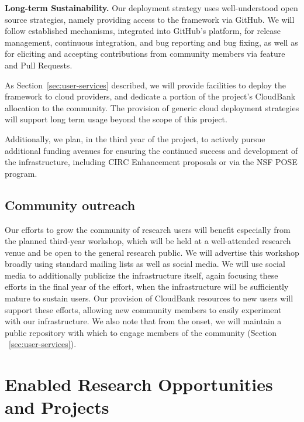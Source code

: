 \vspace{1ex}
\noindent\textbf{Long-term Sustainability.} Our deployment strategy uses
well-understood open source strategies, namely providing access to the framework
via GitHub.  We will follow established mechanisms, integrated into GitHub's
platform, for release management, continuous integration, and bug reporting and
bug fixing, as well as for eliciting and accepting contributions from community
members via feature and Pull Requests. 

As Section~\ref{sec:user-services} described, we will provide facilities to
deploy the framework to cloud providers, and dedicate a portion of the
project's CloudBank allocation to the community.  The provision of generic cloud
deployment strategies will support long term usage beyond the scope of this
project.

Additionally, we plan, in the third year of the project, to actively pursue
additional funding avenues for ensuring the continued success and development of
the infrastructure, including CIRC Enhancement proposals or via the NSF POSE
program. 

\subsection{Community outreach}

Our efforts to grow the community of research users will benefit especially from
the planned third-year workshop, which will be held at a well-attended research
venue and be open to the general research public.  We will advertise this
workshop broadly using standard mailing lists as well as social media.  We will
use social media to additionally publicize the infrastructure itself, again
focusing these efforts in the final year of the effort, when the infrastructure
will be sufficiently mature to sustain users.  Our provision of CloudBank
resources to new users will support these efforts, allowing new community
members to easily experiment with our infrastructure.
We also note that from the onset, we will maintain a public repository 
with which to engage members of the community (Section ~\ref{sec:user-services}).


\section{Enabled Research Opportunities and Projects}

